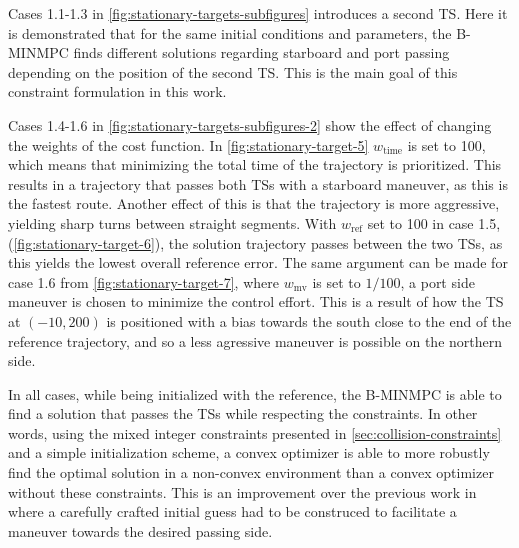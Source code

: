 
Cases 1.1-1.3 in \cref{fig:stationary-targets-subfigures} introduces a second TS. Here it is demonstrated that for the same initial conditions and parameters, the B-MINMPC finds different solutions regarding starboard and port passing depending on the position of the second TS. This is the main goal of this constraint formulation in this work. 

Cases 1.4-1.6 in \cref{fig:stationary-targets-subfigures-2} show the effect of changing the weights of the cost function. In \cref{fig:stationary-target-5} $w_\text{time}$ is set to 100, which means that minimizing the total time of the trajectory is prioritized. This results in a trajectory that passes both TSs with a starboard maneuver, as this is the fastest route. Another effect of this is that the trajectory is more aggressive, yielding sharp turns between straight segments. With $w_\text{ref}$ set to 100 in case 1.5, (\cref{fig:stationary-target-6}), the solution trajectory passes between the two TSs, as this yields the lowest overall reference error. The same argument can be made for case 1.6 from \cref{fig:stationary-target-7}, where $w_\text{mv}$ is set to $1/100$, a port side maneuver is chosen to minimize the control effort. This is a result of how the TS at $(-10, 200)$ is positioned with a bias towards the south close to the end of the reference trajectory, and so a less agressive maneuver is possible on the northern side. 

In all cases, while being initialized with the reference, the B-MINMPC is able to find a solution that passes the TSs while respecting the constraints. In other words, using the mixed integer constraints presented in \cref{sec:collision-constraints} and a simple initialization scheme, a convex optimizer is able to more robustly find the optimal solution in a non-convex environment than a convex optimizer without these constraints. This is an improvement over the previous work in \citep{Thyri2022-MPC} where a carefully crafted initial guess had to be construced to facilitate a maneuver towards the desired passing side.

